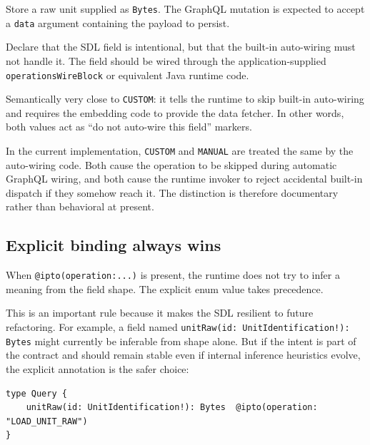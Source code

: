 \begin{description}
\vspace{.2cm}

\item[\texttt{STORE\_RAW\_UNIT}] Store a raw unit supplied as \texttt{Bytes}. The GraphQL mutation is expected to accept a \texttt{data} argument containing the payload to persist.

\vspace{.2cm}

\item[\texttt{CUSTOM}] Declare that the SDL field is intentional, but that the built-in auto-wiring must not handle it. The field should be wired through the application-supplied \texttt{operationsWireBlock} or equivalent Java runtime code.

\vspace{.2cm}

\item[\texttt{MANUAL}] Semantically very close to \texttt{CUSTOM}: it tells the runtime to skip built-in auto-wiring and requires the embedding code to provide the data fetcher. In other words, both values act as ``do not auto-wire this field'' markers.
\end{description}

In the current implementation, \texttt{CUSTOM} and \texttt{MANUAL} are treated the same by the auto-wiring code. Both cause the operation to be skipped during automatic GraphQL wiring, and both cause the runtime invoker to reject accidental built-in dispatch if they somehow reach it. The distinction is therefore documentary rather than behavioral at present.

\subsection{Explicit binding always wins}

When \texttt{@ipto(operation:...)} is present, the runtime does not try to infer a meaning from the field shape. The explicit enum value takes precedence.

This is an important rule because it makes the SDL resilient to future refactoring. For example, a field named \texttt{unitRaw(id: UnitIdentification!): Bytes} might currently be inferable from shape alone. But if the intent is part of the contract and should remain stable even if internal inference heuristics evolve, the explicit annotation is the safer choice:

\begin{lstlisting}[style=GraphQL]
type Query {
    unitRaw(id: UnitIdentification!): Bytes  @ipto(operation: "LOAD_UNIT_RAW")
}
\end{lstlisting}

